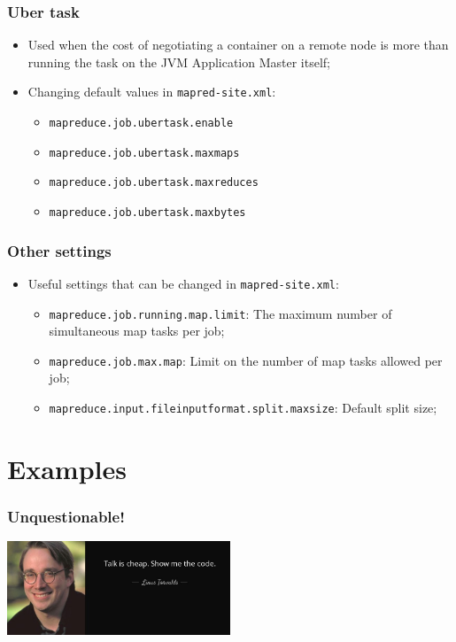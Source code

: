 \documentclass[aspectratio=169]{beamer}
\begin{document}
\begin{frame}
	\frametitle{Uber task}

	\begin{itemize}
		\item Used when the cost of negotiating a container on a remote node is more than running the task on the JVM Application Master itself;
		\item Changing default values in \texttt{mapred-site.xml}:
		      \begin{itemize}
			      \item \texttt{mapreduce.job.ubertask.enable}
			      \item \texttt{mapreduce.job.ubertask.maxmaps}
			      \item \texttt{mapreduce.job.ubertask.maxreduces}
			      \item \texttt{mapreduce.job.ubertask.maxbytes}
		      \end{itemize}
	\end{itemize}
\end{frame}

\begin{frame}
	\frametitle{Other settings}

	\begin{itemize}
		\item Useful settings that can be changed in \texttt{mapred-site.xml}:
		      \begin{itemize}
			      \item \texttt{mapreduce.job.running.map.limit}: The maximum number of simultaneous map tasks per job;
			      \item \texttt{mapreduce.job.max.map}: Limit on the number of map tasks allowed per job;
			      \item \texttt{mapreduce.input.fileinputformat.split.maxsize}: Default split size;
		      \end{itemize}
	\end{itemize}
\end{frame}

\section{Examples}

\begin{frame}
	\frametitle{Unquestionable!}

	\begin{center}
		\includegraphics[height=1\textheight,width=0.5\textwidth,keepaspectratio]{./images/show-me-the-code.jpg}
	\end{center}
\end{frame}
\end{document}
